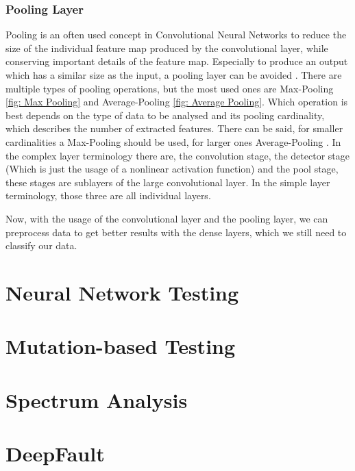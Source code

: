 \subsubsection{Pooling Layer}
Pooling is an often used concept in Convolutional Neural Networks to reduce the size of the individual feature map produced by the convolutional layer, while conserving important details of the feature map.
Especially to produce an output which has a similar size as the input, a pooling layer can be avoided \cite{jain_supervised_2007}.
There are multiple types of pooling operations, but the most used ones are Max-Pooling \ref{fig: Max Pooling} and Average-Pooling \ref{fig: Average Pooling}.
Which operation is best depends on the type of data to be analysed and its pooling cardinality, which describes the number of extracted features.
There can be said, for smaller cardinalities a Max-Pooling should be used, for larger ones Average-Pooling \cite{boureau_theoretical_2010}.
In the complex layer terminology \cite{goodfellow_deep_2016} there are, the convolution stage, the detector stage (Which is just the usage of a nonlinear activation function) and the pool stage, these stages are sublayers of the large convolutional layer.
In the simple layer terminology, those three are all individual layers.


Now, with the usage of the convolutional layer and the pooling layer, we can preprocess data to get better results with the dense layers, which we still need to classify our data.
\section{Neural Network Testing}\label{sec:neural-network-testing}
\section{Mutation-based Testing}\label{sec:mutation-based-testing}
\section{Spectrum Analysis}\label{sec:spectrum-analysis}
\section{DeepFault}\label{sec:deepfault}\cite{wong_dstar_2014}